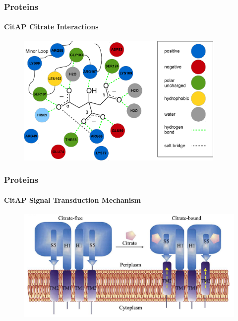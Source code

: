 \documentclass[english]{beamer}
\begin{document}

\begin{frame}
    \frametitle{Proteins}
    \framesubtitle{CitAP Citrate Interactions}

    \begin{figure}
        \includegraphics[width=0.9\textwidth]{figures/citrate_interactions/citrate_interactions.pdf}
    \end{figure}     
\end{frame}      


\begin{frame}
    \frametitle{Proteins}
    \framesubtitle{CitAP Signal Transduction Mechanism}
    \begin{figure}
        \includegraphics[width=.9\linewidth]{figures/CitA_mechanism.png}
    \end{figure}      

    \tiny


\end{frame}  
\end{document}
